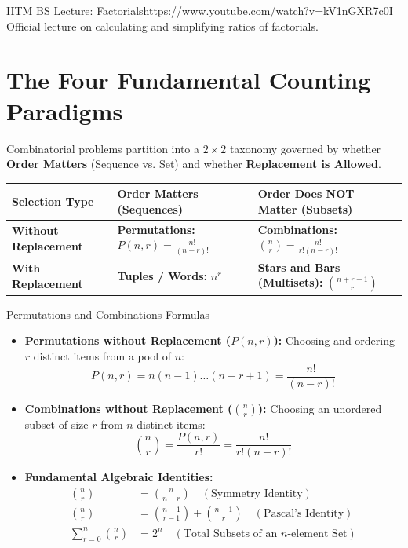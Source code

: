 \begin{videocard}{IITM BS Lecture: Factorials}{https://www.youtube.com/watch?v=kV1nGXR7c0I}
Official lecture on calculating and simplifying ratios of factorials.
\end{videocard}

\section{The Four Fundamental Counting Paradigms}

Combinatorial problems partition into a $2 \times 2$ taxonomy governed by whether \textbf{Order Matters} (Sequence vs. Set) and whether \textbf{Replacement is Allowed}.

\begin{center}
\renewcommand{\arraystretch}{1.3}
\begin{tabular}{p{3.8cm}p{4.2cm}p{4.5cm}}
\toprule
\textbf{Selection Type} & \textbf{Order Matters (Sequences)} & \textbf{Order Does NOT Matter (Subsets)} \\
\midrule
\textbf{Without Replacement} & \textbf{Permutations:} $P(n, r) = \frac{n!}{(n-r)!}$ & \textbf{Combinations:} $\binom{n}{r} = \frac{n!}{r!(n-r)!}$ \\
\textbf{With Replacement} & \textbf{Tuples / Words:} $n^r$ & \textbf{Stars and Bars (Multisets):} $\binom{n + r - 1}{r}$ \\
\bottomrule
\end{tabular}
\end{center}

\begin{definitionbox}{Permutations and Combinations Formulas}
\begin{itemize}
    \item \textbf{Permutations without Replacement ($P(n, r)$):} Choosing and ordering $r$ distinct items from a pool of $n$:
    $$P(n, r) = n(n-1)\dots(n-r+1) = \frac{n!}{(n-r)!}$$
    \item \textbf{Combinations without Replacement ($\binom{n}{r}$):} Choosing an unordered subset of size $r$ from $n$ distinct items:
    $$\binom{n}{r} = \frac{P(n, r)}{r!} = \frac{n!}{r!(n-r)!}$$
    \item \textbf{Fundamental Algebraic Identities:}
    \begin{align*}
        \binom{n}{r} &= \binom{n}{n-r} \quad (\text{Symmetry Identity}) \\
        \binom{n}{r} &= \binom{n-1}{r-1} + \binom{n-1}{r} \quad (\text{Pascal's Identity}) \\
        \sum_{r=0}^n \binom{n}{r} &= 2^n \quad (\text{Total Subsets of an } n\text{-element Set})
    \end{align*}
\end{itemize}
\end{definitionbox}

